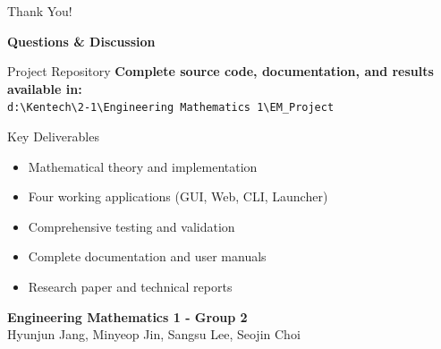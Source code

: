 \documentclass[aspectratio=169]{beamer}
\begin{document}
\begin{frame}{Thank You!}
    \begin{center}
        {\Large \textbf{Questions \& Discussion}}
        
        \vspace{1cm}
        
        \begin{block}{Project Repository}
            \textbf{Complete source code, documentation, and results available in:}\\
            \texttt{d:\textbackslash Kentech\textbackslash 2-1\textbackslash Engineering Mathematics 1\textbackslash EM\_Project}
        \end{block}
        
        \vspace{0.5cm}
        
        \begin{block}{Key Deliverables}
            \begin{itemize}
                \item Mathematical theory and implementation
                \item Four working applications (GUI, Web, CLI, Launcher)
                \item Comprehensive testing and validation
                \item Complete documentation and user manuals
                \item Research paper and technical reports
            \end{itemize}
        \end{block}
        
        \vspace{0.5cm}
        
        {\large \textcolor{kentech_blue}{\textbf{Engineering Mathematics 1 - Group 2}}}\\
        {\small Hyunjun Jang, Minyeop Jin, Sangsu Lee, Seojin Choi}
    \end{center}
\end{frame}
\end{document}
